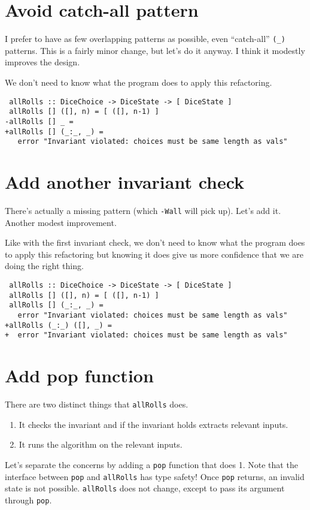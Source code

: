 \section{Avoid catch-all pattern}

I prefer to have as few overlapping patterns as possible, even ``catch-all'' \texttt{(\_)} patterns. This is a fairly minor change, but let's do it anyway. I think it modestly improves the design.

We don't need to know what the program does to apply this refactoring.

\begin{verbatim}
 allRolls :: DiceChoice -> DiceState -> [ DiceState ]
 allRolls [] ([], n) = [ ([], n-1) ]
-allRolls [] _ =
+allRolls [] (_:_, _) =
   error "Invariant violated: choices must be same length as vals"
\end{verbatim}

\section{Add another invariant check}

There's actually a missing pattern (which \texttt{-Wall} will pick up). Let's add it. Another modest improvement.

Like with the first invariant check, we don't need to know what the program does to apply this refactoring but knowing it does give us more confidence that we are doing the right thing.

\begin{verbatim}
 allRolls :: DiceChoice -> DiceState -> [ DiceState ]
 allRolls [] ([], n) = [ ([], n-1) ]
 allRolls [] (_:_, _) =
   error "Invariant violated: choices must be same length as vals"
+allRolls (_:_) ([], _) =
+  error "Invariant violated: choices must be same length as vals"
\end{verbatim}

\section{Add pop function}

There are two distinct things that \texttt{allRolls} does.

\begin{enumerate}
\item It checks the invariant and if the invariant holds extracts relevant inputs.
\item It runs the algorithm on the relevant inputs.
\end{enumerate}
Let's separate the concerns by adding a \texttt{pop} function that does 1. Note that the interface between \texttt{pop} and \texttt{allRolls} has type safety! Once \texttt{pop} returns, an invalid state is not possible. \texttt{allRolls} does not change, except to pass its argument through \texttt{pop}.


